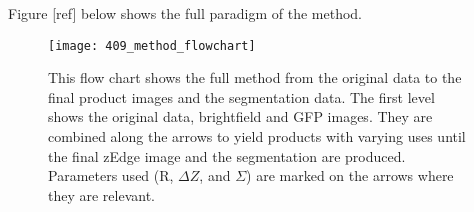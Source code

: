 Figure [ref] below shows the full paradigm of the method.
\begin{figure}[h!]
 \centering
 \texttt{[image: 409\_method\_flowchart]}
 \caption[Method flow chart]{
 	This flow chart shows the full method from the original data to the final product images and the segmentation data. The first level shows the original data, brightfield and GFP images. They are combined along the arrows to yield products with varying uses until the final zEdge image and the segmentation are produced. Parameters used (R, $\Delta Z$, and $\Sigma$) are marked on the arrows where they are relevant.
 }
 \label{fig:flowchart}
\end{figure}
